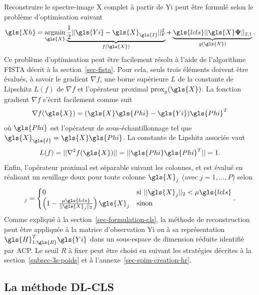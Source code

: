 Reconstruire le spectre-image \gls{X} complet à partir de \gls{Yi} peut être formulé selon le problème d'optimisation suivant
\begin{equation}
\gls{Xh}=\argmin_{\gls{X}} 
    \underbrace{\frac{1}{2} \frobnorm{\gls{Yi} - \gls{X}_{\gls{I}}}}_{f(\gls{X})} +
    \underbrace{ \gls{lcls} ||\gls{X}\boldsymbol\Psi||_{2, 1}}_{g(\gls{X})}.
\end{equation}
Ce problème d'optimisation peut être facilement résolu à l'aide de l'algorithme FISTA décrit à la section~\ref{sec-fista}. Pour cela, seuls trois éléments doivent être évalués, à savoir le gradient $\nabla f$, une borne supérieure $L$ de la constante de Lipschitz $L(f)$ de $\nabla f$ et l'opérateur proximal  $\mathrm{prox}_{g}(\gls{X})$. La fonction gradient $\nabla f$ s'écrit facilement comme suit
\begin{equation}
    \nabla f(\gls{X}) = (\gls{X}\gls{Phi} - \gls{Yi})\gls{Phi}^T
\end{equation}
où $\gls{Phi}$ est l'opérateur de sous-échantillonnage tel que $\gls{X}_{\gls{I}} = \gls{X}\gls{Phi}$. La constante de Lipshitz associée vaut
\begin{equation}
    L(f) = ||\nabla^2 f(\gls{X})|| = ||\gls{Phi}\gls{Phi}^T|| = 1.
\end{equation}
Enfin, l'opérateur proximal est séparable suivant les colonnes, et est évalué en réalisant un seuillage doux pour toute colonne $\gls{X}_j$ (avec $j=1, \dots, P$) selon~\cite{jenatton2011proximal}
\begin{equation}
[\mathrm{prox}_{\mu g}(\gls{X})]_j = 
\begin{cases}
0&\text{si}\ ||\gls{X}_j||_2 < \mu \gls{lcls}\\
\left(1-\frac{\mu\gls{lcls}}{||\gls{X}_j||_2}\right)\gls{X}_j&\text{sinon}\\
\end{cases}.\label{eq-prox-op}
\end{equation}
Comme expliqué à la section~\ref{sec-formulation-cls}, la méthode de reconstruction peut être appliquée à la matrice d'observation \gls{Yi} ou à sa représentation $\gls{H}_{1:\gls{R}}^T\gls{Yi}$ dans un sous-espace de dimension réduite identifié par ACP. Le seuil $R$ à fixer peut être choisi en suivant les stratégies décrites à la section~\ref{subsec-3s-poids} et à l'annexe~\ref{sec-spim-creation-hr}.



\subsection{La méthode DL-CLS}

